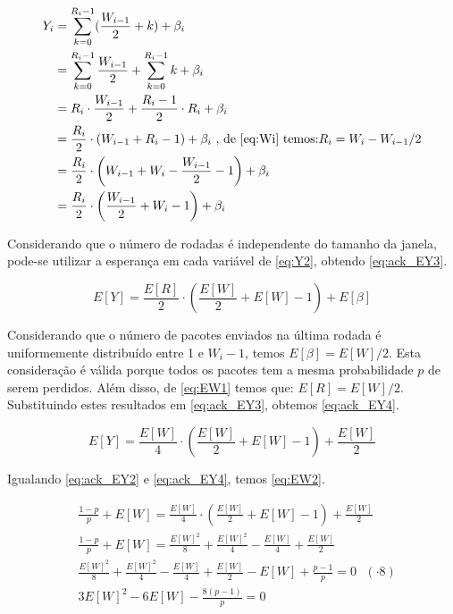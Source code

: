 \begin{align} \label{eq:Y2}
\nonumber Y_i &= \sum_{k = 0}^{R_i - 1} (\frac{W_{i - 1}}{2} + k) + \beta_i \\
\nonumber &= \sum_{k = 0}^{R_i - 1} \frac{W_{i - 1}}{2} + \sum_{k = 0}^{R_i - 1} k + \beta_i \\
\nonumber &= R_i \cdot  \frac{W_{i - 1}}{2} + \frac{R_i - 1}{2} \cdot  R_i + \beta_i \\
\nonumber &= \frac{R_i}{2} \cdot  (W_{i - 1} + R_i - 1) + \beta_i \text{ , de \eqref{eq:Wi} temos:$R_i = W_i - W_{i-1}/2$} \\
\nonumber &= \frac{R_i}{2} \cdot  \left(W_{i - 1} + W_i - \frac{W_{i-1}}{2} - 1\right) + \beta_i \\
&= \frac{R_i}{2} \cdot  \left(\frac{W_{i-1}}{2} + W_i - 1\right) + \beta_i 
\end{align}

Considerando que o número de rodadas é independente do tamanho da janela, pode-se utilizar
a esperança em cada variável de \eqref{eq:Y2}, obtendo \eqref{eq:ack_EY3}.

\begin{equation} \label{eq:ack_EY3}
E[Y] = \frac{E[R]}{2} \cdot  \left(\frac{E[W]}{2} + E[W] - 1\right) + E[\beta] 
\end{equation}

Considerando que o número de pacotes enviados na última rodada é uniformemente distribuído entre
1 e $W_i - 1$, temos $E[\beta] = E[W]/2$. Esta consideração é válida porque todos os pacotes tem 
a mesma probabilidade $p$ de serem perdidos. Além disso, de \eqref{eq:EW1} temos que: $E[R]=E[W]/2$.
Substituindo estes resultados em \eqref{eq:ack_EY3}, obtemos \eqref{eq:ack_EY4}.

\begin{equation} \label{eq:ack_EY4}
E[Y] = \frac{E[W]}{4} \cdot  \left(\frac{E[W]}{2} + E[W] - 1\right) + \frac{E[W]}{2}
\end{equation}

Igualando \eqref{eq:ack_EY2} e \eqref{eq:ack_EY4}, temos \eqref{eq:EW2}.

\begin{align} \label{eq:EW2}
\nonumber & \frac{1 - p}{p} + E[W] = \frac{E[W]}{4} \cdot  \left(\frac{E[W]}{2} + E[W] - 1\right) + \frac{E[W]}{2} \\
\nonumber & \frac{1 - p}{p} + E[W] = \frac{E[W]^2}{8} + \frac{E[W]^2}{4} - \frac{E[W]}{4} + \frac{E[W]}{2} \\
\nonumber & \frac{E[W]^2}{8} + \frac{E[W]^2}{4} - \frac{E[W]}{4} + \frac{E[W]}{2} - E[W] + \frac{p - 1}{p} = 0 \text{   $(\cdot 8)$}\\
& 3E[W]^2 - 6E[W] - \frac{8(p - 1)}{p} = 0
\end{align}


